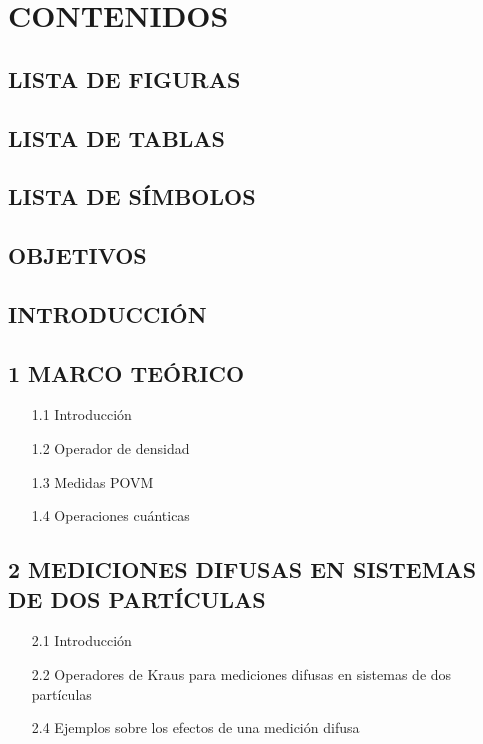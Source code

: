 \chapter{CONTENIDOS}

\section*{LISTA DE FIGURAS}

\section*{LISTA DE TABLAS}

\section*{LISTA DE SÍMBOLOS}

\section*{OBJETIVOS}

\section*{INTRODUCCIÓN}

\section*{1 MARCO TEÓRICO}
\begin{itemize}
\item[1.1] Introducción
\item[1.2] Operador de densidad
\item[1.3] Medidas POVM
\item[1.4] Operaciones cuánticas 
\end{itemize}

\section*{2 MEDICIONES DIFUSAS EN SISTEMAS DE DOS PARTÍCULAS}
\begin{itemize}
\item[2.1] Introducción
\item[2.2] Operadores de Kraus para mediciones difusas en sistemas de dos partículas
\item[2.4] Ejemplos sobre los efectos de una medición difusa
\end{itemize}

